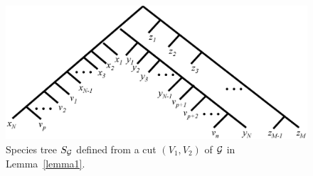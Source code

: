 \documentclass[9.5pt,journal,letterpaper,compsoc]{IEEEtran}
\begin{document}
\begin{figure}[t!]
\begin{center}
\includegraphics[width=0.9\columnwidth]{Figure5}
\end{center}
\caption{Species tree $S_{\cal G}$ defined from a cut $(V_1, V_2)$
of $\cal G$ in Lemma~\ref{lemma1}.}
 \label{SpeciesTree}
\end{figure}
\end{document}
